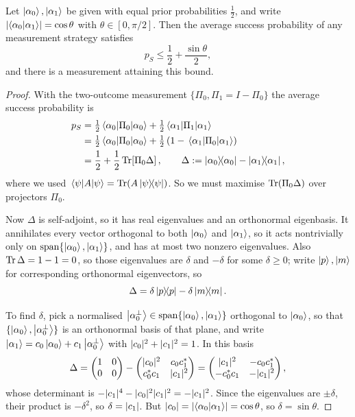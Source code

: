 \documentclass[a4paper]{scrartcl}
\begin{document}
\begin{theorem}
	Let $\ket{\alpha_0},\ket{\alpha_1}$ be given with equal prior probabilities $\tfrac12$, and write $\abs{\ip{\alpha_0}{\alpha_1}} = \cos\theta$ with $\theta \in [0,\pi/2]$. Then the average success probability of any measurement strategy satisfies
	$$p_S \leq \frac{1}{2} + \frac{\sin\theta}{2},$$
	and there is a measurement attaining this bound.
\end{theorem}

\begin{proof}
	With the two-outcome measurement $\{\Pi_0,\Pi_1 = I - \Pi_0\}$ the average success probability is
	\begin{align*}
		p_S &= \tfrac12\mel{\alpha_0}{\Pi_0}{\alpha_0} + \tfrac12\mel{\alpha_1}{\Pi_1}{\alpha_1}\\
		&= \tfrac12\mel{\alpha_0}{\Pi_0}{\alpha_0} + \tfrac12\left(1 - \mel{\alpha_1}{\Pi_0}{\alpha_1}\right) \\
		&= \frac12 + \frac12\Tr\!\left[\Pi_0 \Delta\right], \qquad \Delta := \op{\alpha_0}{\alpha_0} - \op{\alpha_1}{\alpha_1},
	\end{align*}
	where we used $\mel{\psi}{A}{\psi} = \Tr(A\op{\psi}{\psi})$. So we must maximise $\Tr(\Pi_0\Delta)$ over projectors $\Pi_0$.

	Now $\Delta$ is self-adjoint, so it has real eigenvalues and an orthonormal eigenbasis. It annihilates every vector orthogonal to both $\ket{\alpha_0}$ and $\ket{\alpha_1}$, so it acts nontrivially only on $\operatorname{span}\{\ket{\alpha_0},\ket{\alpha_1}\}$, and has at most two nonzero eigenvalues. Also $\Tr\Delta = 1 - 1 = 0$, so those eigenvalues are $\delta$ and $-\delta$ for some $\delta \geq 0$; write $\ket{p}, \ket{m}$ for corresponding orthonormal eigenvectors, so
	$$\Delta = \delta\op{p}{p} - \delta\op{m}{m}.$$

	To find $\delta$, pick a normalised $\ket{\alpha_0^\perp} \in \operatorname{span}\{\ket{\alpha_0},\ket{\alpha_1}\}$ orthogonal to $\ket{\alpha_0}$, so that $\{\ket{\alpha_0}, \ket{\alpha_0^\perp}\}$ is an orthonormal basis of that plane, and write $\ket{\alpha_1} = c_0\ket{\alpha_0} + c_1\ket{\alpha_0^\perp}$ with $\lvert c_0\rvert^2 + \lvert c_1\rvert^2 = 1$. In this basis
	$$\Delta = \begin{pmatrix} 1 & 0 \\ 0 & 0\end{pmatrix} - \begin{pmatrix} \lvert c_0\rvert^2 & c_0c_1^* \\ c_0^*c_1 & \lvert c_1\rvert^2 \end{pmatrix} = \begin{pmatrix} \lvert c_1\rvert^2 & -c_0c_1^* \\ -c_0^*c_1 & -\lvert c_1\rvert^2\end{pmatrix},$$
	whose determinant is $-\lvert c_1\rvert^4 - \lvert c_0\rvert^2\lvert c_1\rvert^2 = -\lvert c_1\rvert^2$. Since the eigenvalues are $\pm\delta$, their product is $-\delta^2$, so $\delta = \lvert c_1\rvert$. But $\abs{c_0} = \abs{\ip{\alpha_0}{\alpha_1}} = \cos\theta$, so $\delta = \sin\theta$.


\end{proof}
\end{document}

